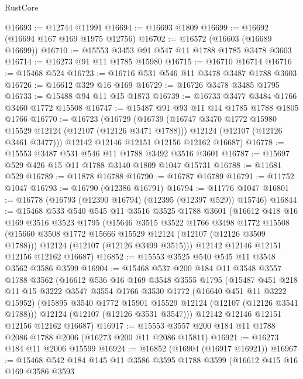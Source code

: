 \begin{lexlean}{RustCore}
\begin{coremodule}
@16693 := @12744 @11991
@16694 := @16693 @1809
@16699 := @16692 (@16694 @167 @169 @1975 @12756)
@16702 := @16572 (@16603 (@16689 @16699))
@16710 := @15553 @3453 @91 @547 @11 @1788 @1785 @3478 @3603
@16714 := @16273 @91 @11 @1785 @15980
@16715 := @16710 @16714
@16716 := @15468 @524
@16723 := @16716 @531 @546 @11 @3478 @3487 @1788 @3603
@16726 := @16612 @329 @16 @169
@16729 := @16726 @3478 @3485 @1795
@16733 := @15488 @94 @11 @15 @1873
@16739 := @16733 @3477 @3484 @1766 @3460 @1772 @15508
@16747 := @15487 @91 @93 @11 @14 @1785 @1788 @1805 @1766
@16770 := @16723
    (@16729
      (@16739
        (@16747 @3470 @1772 @15980 @15529 @12124 (@12107 (@12126 @3471 @1788)))
        @12124
        (@12107 (@12126 @3461 @3477)))
      @12142
      @12146
      @12151
      @12156
      @12162
      @16687)
@16778 := @15553 @3487 @531 @546 @11 @1788 @3492 @3516 @3601
@16787 := @15697 @529 @426 @15 @11 @1788 @3140 @1809 @1047 @15731
@16788 := @11681 @529
@16789 := @11878 @16788
@16790 := @16787 @16789
@16791 := @11752 @1047
@16793 := @16790 (@12386 @16791)
@16794 := @11776 @1047
@16801 := @16778 (@16793 (@12390 @16794) (@12395 (@12397 @529)) @15746)
@16844 := @15468
    @533
    @540
    @545
    @11
    @3516
    @3525
    @1788
    @3601
    (@16612
      @418
      @16
      @169
      @3516
      @3523
      @1795
      (@15646
        @3515
        @3522
        @1766
        @3498
        @1772
        @15508
        (@15660 @3508 @1772 @15666 @15529 @12124 (@12107 (@12126 @3509 @1788)))
        @12124
        (@12107 (@12126 @3499 @3515)))
      @12142
      @12146
      @12151
      @12156
      @12162
      @16687)
@16852 := @15553 @3525 @540 @545 @11 @3548 @3562 @3586 @3599
@16904 := @15468
    @537
    @200
    @184
    @11
    @3548
    @3557
    @1788
    @3562
    (@16612
      @536
      @16
      @169
      @3548
      @3555
      @1795
      (@15487
        @451
        @218
        @11
        @15
        @3222
        @3547
        @3554
        @1766
        @3530
        @1772
        (@16640 @451 @11 @3222 @15952)
        (@15895 @3540 @1772 @15901 @15529 @12124 (@12107 (@12126 @3541 @1788)))
        @12124
        (@12107 (@12126 @3531 @3547)))
      @12142
      @12146
      @12151
      @12156
      @12162
      @16687)
@16917 := @15553 @3557 @200 @184 @11 @1788 @2086 @1788 @2006 (@16273 @200 @11 @2086 @15811)
@16921 := @16273 @184 @11 @2006 @15599
@16924 := @16852 (@16904 (@16917 @16921))
@16967 := @15468
    @542
    @184
    @145
    @11
    @3586
    @3595
    @1788
    @3599
    (@16612
      @415
      @16
      @169
      @3586
      @3593

\end{coremodule}
\end{lexlean}
